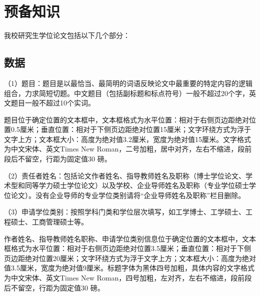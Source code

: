 \chapter{预备知识}
我校研究生学位论文包括以下几个部分：
\section{数据}
（1）题目：题目是以最恰当、最简明的词语反映论文中最重要的特定内容的逻辑组合，力求简短切题。中文题目（包括副标题和标点符号）一般不超过20个字，英文题目一般不超过10个实词。
\par
题目位于确定位置的文本框中，文本框格式为水平位置：相对于右侧页边距绝对位置0.5厘米；垂直位置：相对于下侧页边距绝对位置15厘米；文字环绕方式为浮于文字上方；文本框大小：高度为绝对值3.2厘米，宽度为绝对值15厘米。文字格式为中文宋体、英文Times New Roman，二号加粗，居中对齐，左右不缩进，段前段后不留空，行距为固定值30 磅。
\par
（2）责任者姓名：包括论文作者姓名、指导教师姓名及职称（博士学位论文、学术型和同等学力硕士学位论文）以及学校、企业导师姓名及职称（专业学位硕士学位论文）。没有企业导师的专业学位类别请将“企业导师姓名及职称”栏目删除。
\par
（3）申请学位类别：按照学科门类和学位层次填写，如工学博士、工学硕士、工程硕士、工商管理硕士等。
\par
作者姓名、指导教师姓名职称、申请学位类别信息位于确定位置的文本框中，文本框格式为水平位置：相对于右侧页边距绝对位置3.5厘米；垂直位置：相对于下侧页边距绝对位置20厘米；文字环绕方式为浮于文字上方；文本框大小：高度为绝对值3.5厘米，宽度为绝对值9厘米。标题字体为黑体四号加粗，具体内容的文字格式为中文宋体、英文Times New Roman，四号加粗，左对齐，左右不缩进，段前段后不留空，行距为固定值30 磅。

